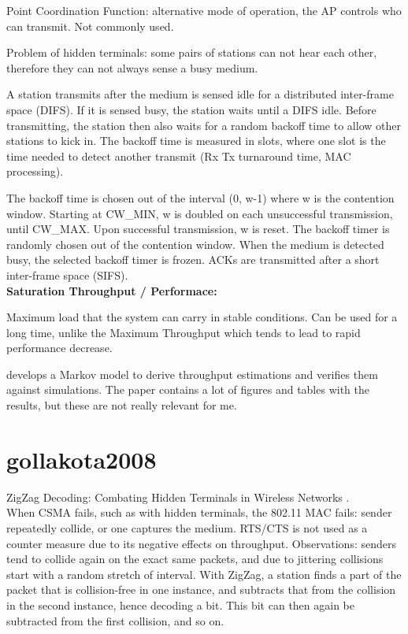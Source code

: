 Point Coordination Function: alternative mode of operation, the AP controls who can transmit. Not commonly used.

Problem of hidden terminals: some pairs of stations can not hear each other, therefore they can not always sense a busy medium.

A station transmits after the medium is sensed idle for a distributed inter-frame space (DIFS). If it is sensed busy, the station waits until a DIFS idle. Before transmitting, the station then also waits for a random backoff time to allow other stations to kick in. The backoff time is measured in slots, where one slot is the time needed to detect another transmit (Rx Tx turnaround time, MAC processing).

The backoff time is chosen out of the interval (0, w-1) where w is the contention window. Starting at CW\_MIN, w is doubled on each unsuccessful transmission, until CW\_MAX. Upon successful transmission, w is reset. The backoff timer is randomly chosen out of the contention window. When the medium is detected busy, the selected backoff timer is frozen. ACKs are transmitted after a short inter-frame space (SIFS).\\

\textbf{Saturation Throughput / Performace:}

Maximum load that the system can carry in stable conditions. Can be used for a long time, unlike the Maximum Throughput which tends to lead to rapid performance decrease.

\cite{bianchi2000} develops a Markov model to derive throughput estimations and verifies them against simulations. The paper contains a lot of figures and tables with the results, but these are not really relevant for me.



\section*{gollakota2008}

ZigZag Decoding: Combating Hidden Terminals in Wireless Networks \cite{gollakota2008}.\\

When CSMA fails, such as with hidden terminals, the 802.11 MAC fails: sender repeatedly collide, or one captures the medium. RTS/CTS is not used as a counter measure due to its negative effects on throughput. Observations: senders tend to collide again on the exact same packets, and due to jittering collisions start with a random stretch of interval. With ZigZag, a station finds a part of the packet that is collision-free in one instance, and subtracts that from the collision in the second instance, hence decoding a bit. This bit can then again be subtracted from the first collision, and so on.


